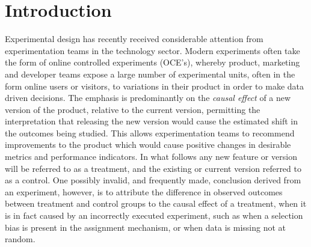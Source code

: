 \documentclass[11pt]{article}
\begin{document}
\section{Introduction}
Experimental design has recently received considerable attention from experimentation teams in the technology sector.
Modern experiments often take the form of online controlled experiments (OCE's), whereby product, marketing and developer teams expose a large number of experimental units, often in the form online users or visitors, to variations in their product in order to make data driven decisions.
The emphasis is predominantly on the \textit{causal effect} of a new version of the product, relative to the current version, permitting the interpretation that releasing the new version would cause the estimated shift in the outcomes being studied.
This allows experimentation teams to recommend improvements to the product which would cause positive changes in desirable metrics and performance indicators.
In what follows any new feature or version will be referred to as a treatment, and the existing or current version referred to as a control.
One possibly invalid, and frequently made, conclusion derived from an experiment, however, is to attribute the difference in observed outcomes between treatment and control groups to the causal effect of a treatment, when it is in fact caused by an incorrectly executed experiment, such as when a selection bias is present in the assignment mechanism, or when data is missing not at random.
\end{document}
